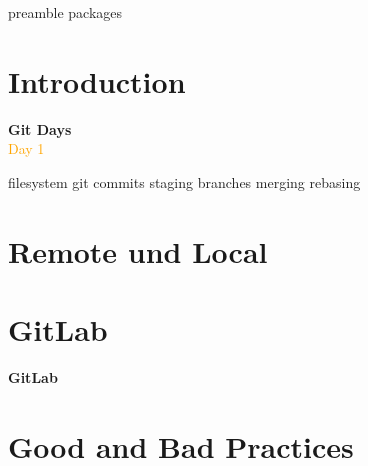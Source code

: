 \RequirePackage{import}
{preamble}
{packages}


    \section{Introduction}\label{sec:introduction}

    \begin{frame}[c]
        \centering
        \Huge
        \textbf{Git Days}
        \\
        \vspace{1ex}
        \Large
        \textcolor{orange}{Day 1}
    \end{frame}

    {filesystem}
    {git}
    {commits}
    {staging}
    {branches}
    {merging}
    {rebasing}


    \section{Remote und Local}\label{sec:remote-und-local}

    \begin{frame}[c]
        \slidehead
        \center
    \end{frame}


    \section{GitLab}\label{sec:gitlab}

    \begin{frame}[c]
        \centering
        \Large
        \textbf{GitLab}
    \end{frame}


    \section{Good and Bad Practices}\label{sec:good-and-bad-practices}

